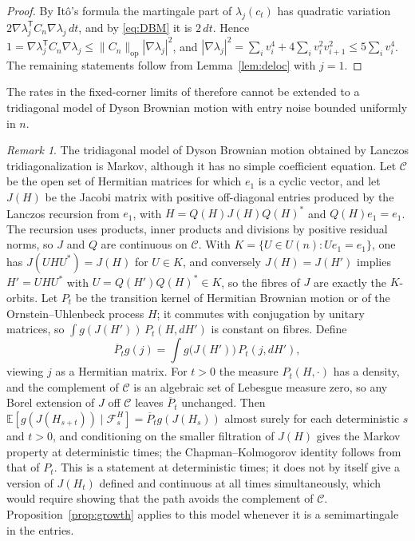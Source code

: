\documentclass[11pt]{amsart}
\theoremstyle{remark}
\newtheorem{remark}[theorem]{Remark}
\newcommand{\EE}{\mathbb{E}}
\begin{document}
\begin{proof}
By It\^o's formula the martingale part of $\lambda_j(c_t)$ has quadratic variation
$2\nabla\lambda_j^{\mathsf T}C_n\nabla\lambda_j\,dt$, and by \eqref{eq:DBM} it is $2\,dt$. Hence
$1=\nabla\lambda_j^{\mathsf T}C_n\nabla\lambda_j\le\|C_n\|_{\mathrm{op}}|\nabla\lambda_j|^2$, and
$|\nabla\lambda_j|^2=\sum_iv_i^4+4\sum_iv_i^2v_{i+1}^2\le5\sum_iv_i^4$. The remaining statements follow from
Lemma~\ref{lem:deloc} with $j=1$.
\end{proof}

The rates in the fixed-corner limits of \cite{EJN24} therefore cannot be extended to a tridiagonal model of Dyson
Brownian motion with entry noise bounded uniformly in $n$.

\begin{remark}\label{rem:lanczos}
The tridiagonal model of Dyson Brownian motion obtained by Lanczos tridiagonalization is Markov, although it has no
simple coefficient equation. Let $\mathcal C$ be the open set of Hermitian matrices for which $e_1$ is a cyclic vector,
and let $J(H)$ be the Jacobi matrix with positive off-diagonal entries produced by the Lanczos recursion from $e_1$,
with $H=Q(H)J(H)Q(H)^*$ and $Q(H)e_1=e_1$. The recursion uses products, inner products and divisions by positive
residual norms, so $J$ and $Q$ are continuous on $\mathcal C$. With $K=\{U\in U(n):Ue_1=e_1\}$, one has
$J(UHU^*)=J(H)$ for $U\in K$, and conversely $J(H)=J(H')$ implies $H'=UHU^*$ with $U=Q(H')Q(H)^*\in K$, so the fibres of
$J$ are exactly the $K$-orbits. Let $P_t$ be the transition kernel of Hermitian Brownian motion or of the
Ornstein--Uhlenbeck process $H$; it commutes with conjugation by unitary matrices, so $\int g(J(H'))\,P_t(H,dH')$ is
constant on fibres. Define
\[
\overline P_tg(j)=\int g\bigl(J(H')\bigr)\,P_t(j,dH'),
\]
viewing $j$ as a Hermitian matrix. For $t>0$ the measure $P_t(H,\cdot)$ has a density, and the complement of
$\mathcal C$ is an algebraic set of Lebesgue measure zero, so any Borel extension of $J$ off $\mathcal C$ leaves
$\overline P_t$ unchanged. Then $\EE[g(J(H_{s+t}))\mid\mathcal F^H_s]=\overline P_tg(J(H_s))$ almost surely for each
deterministic $s$ and $t>0$, and conditioning on the smaller filtration of $J(H)$ gives the Markov property at
deterministic times; the Chapman--Kolmogorov identity follows from that of $P_t$. This is a statement at deterministic
times; it does not by itself give a version of $J(H_t)$ defined and continuous at all times simultaneously, which would
require showing that the path avoids the complement of $\mathcal C$. Proposition~\ref{prop:growth} applies to this model
whenever it is a semimartingale in the entries.
\end{remark}
\end{document}
